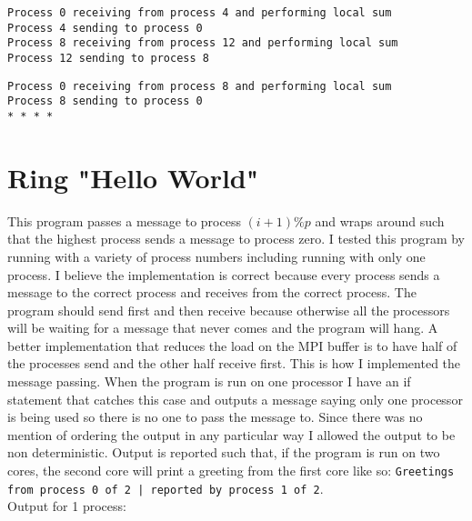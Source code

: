 \documentclass[11pt,a4paper,oneside]{report}
\begin{document}
\noindent\texttt{Process 0 receiving from process 4 and performing local sum\\
Process 4 sending to process 0\\
Process 8 receiving from process 12 and performing local sum\\
Process 12 sending to process 8\\}

\noindent\texttt{Process 0 receiving from process 8 and performing local sum\\
Process 8 sending to process 0\\}
\noindent\texttt{* * * *\\}

\section{Ring "Hello World"}

This program passes a message to process $ (i+1) \%p $ and wraps around such that the highest process sends a message to process zero.  I tested this program by running with a variety of process numbers including running with only one process.  I believe the implementation is correct because every process sends a message to the correct process and receives from the correct process.  The program should send first and then receive because otherwise all the processors will be waiting for a message that never comes and the program will hang.  A better implementation that reduces the load on the MPI buffer is to have half of the processes send and the other half receive first.  This is how I implemented the message passing.  When the program is run on one processor I have an if statement that catches this case and outputs a message saying only one processor is being used so there is no one to pass the message to.  Since there was no mention of ordering the output in any particular way I allowed the output to be non deterministic.  Output is reported such that, if the program is run on two cores, the second core will print a greeting from the first core like so:  \texttt{Greetings from process 0 of 2 | reported by process 1 of 2}.\\

Output for 1 process:
\end{document}
